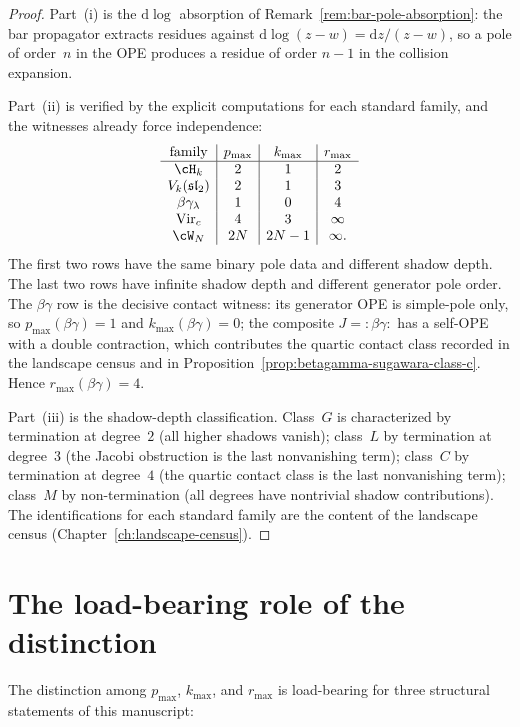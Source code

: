\begin{proof}
Part~(i) is the $\mathrm{d}\log$ absorption of
Remark~\ref{rem:bar-pole-absorption}: the bar propagator extracts
residues against $\mathrm{d}\log(z-w) = \mathrm{d}z/(z-w)$, so a
pole of order~$n$ in the OPE produces a residue of order $n-1$ in
the collision expansion.

Part~(ii) is verified by the explicit computations for each standard
family, and the witnesses already force independence:
\[
\begin{array}{c|c|c|c}
\text{family} & p_{\max} & k_{\max} & r_{\max}\\
\hline
\cH_k & 2 & 1 & 2\\
V_k(\mathfrak{sl}_2) & 2 & 1 & 3\\
\beta\gamma_\lambda & 1 & 0 & 4\\
\mathrm{Vir}_c & 4 & 3 & \infty\\
\cW_N & 2N & 2N-1 & \infty .
\end{array}
\]
The first two rows have the same binary pole data and different
shadow depth. The last two rows have infinite shadow depth and
different generator pole order. The $\beta\gamma$ row is the decisive
contact witness: its generator OPE is simple-pole only, so
$p_{\max}(\beta\gamma)=1$ and
$k_{\max}(\beta\gamma)=0$; the composite
$J={:}\beta\gamma{:}$ has a self-OPE with a double contraction,
which contributes the quartic contact class recorded in the
landscape census and in
Proposition~\ref{prop:betagamma-sugawara-class-c}. Hence
$r_{\max}(\beta\gamma)=4$.

Part~(iii) is the shadow-depth classification. Class~$G$ is
characterized by termination at degree~$2$ (all higher shadows
vanish); class~$L$ by termination at degree~$3$ (the Jacobi
obstruction is the last nonvanishing term); class~$C$ by termination
at degree~$4$ (the quartic contact class is the last nonvanishing
term); class~$M$ by non-termination (all degrees have nontrivial
shadow contributions). The identifications for each standard family
are the content of the landscape census
\textup{(}Chapter~\textup{\ref{ch:landscape-census}}\textup{)}.
\end{proof}

\section{The load-bearing role of the distinction}
\label{sec:three-invariants-load-bearing}

The distinction among $p_{\max}$, $k_{\max}$, and $r_{\max}$ is
load-bearing for three structural statements of this manuscript:

